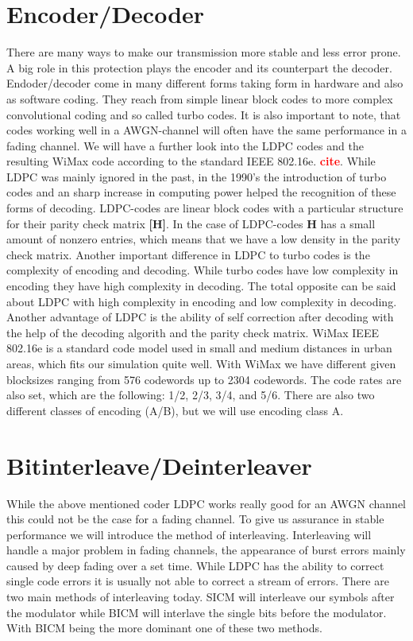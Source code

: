 \documentclass[12pt,oneside, reqno]{report}
\newcommand\boldred[1]{\textcolor{red}{\textbf{#1}}}
\begin{document}
\section{Encoder/Decoder}
\label{sec:code}
There are many ways to make our transmission more stable and less error prone. A big role in this protection plays the encoder and its counterpart the decoder. Endoder/decoder come in many different forms taking form in hardware and also as software coding. They reach from simple linear block codes to more complex convolutional coding and so called turbo codes. It is also important to note, that codes working well in a AWGN-channel will often have the same performance in a fading channel. We will have a further look into the \gls{LDPC} codes and the resulting WiMax code according to the standard IEEE 802.16e. \boldred{cite}. While \gls{LDPC} was mainly ignored in the past, in the 1990's the introduction of turbo codes and an sharp increase in computing power helped the recognition of these forms of decoding.
\gls{LDPC}-codes are linear block codes with a particular structure for their parity check matrix \textbf{[H]}. In the case of \gls{LDPC}-codes \textbf{H} has a small amount of nonzero entries, which means that we have a low density in the parity check matrix.
Another important difference in LDPC to turbo codes is the complexity of encoding and decoding. While turbo codes have low complexity in encoding they have high complexity in decoding. The total opposite can be said about \gls{LDPC} with high complexity in encoding and low complexity in decoding. Another advantage of \gls{LDPC} is the ability of self correction after decoding with the help of the decoding algorith and the parity check matrix.  
WiMax IEEE 802.16e is a standard code model used in small and medium distances in urban areas, which fits our simulation quite well. With WiMax we have different given blocksizes ranging from 576 codewords up to 2304 codewords. The code rates are also set, which are the following: 1/2, 2/3, 3/4, and 5/6. There are also two different classes of encoding (A/B), but we will use encoding class A.


\section{Bitinterleave/Deinterleaver}
\label{sec:BIC}
While the above mentioned coder \gls{LDPC} works really good for an AWGN channel this could not be the case for a fading channel. To give us assurance in stable performance we will introduce the method of interleaving. Interleaving will handle a major problem in fading channels, the appearance of burst errors mainly caused by deep fading over a set time. While \gls{LDPC} has the ability to correct single code errors it is usually not able to correct a stream of errors. 
There are two main methods of interleaving today.
\gls{SICM} will interleave our symbols after the modulator while \gls{BICM} will interlave the single bits before the modulator. With \gls{BICM} being the more dominant one of these two methods.
\newpage
\end{document}
